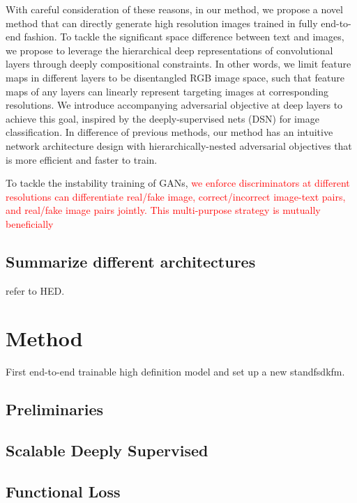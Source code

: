 \documentclass[10pt,twocolumn,letterpaper]{article}
\begin{document}
With careful consideration of these reasons, in our method, we propose a novel method that can directly generate high resolution images trained in fully end-to-end fashion. To tackle the significant space difference between text and images, we propose to leverage the hierarchical deep representations of convolutional layers through deeply compositional constraints. In other words, we limit feature maps in different layers to be disentangled RGB image space, such that feature maps of any layers can linearly represent targeting images at corresponding resolutions. We introduce accompanying adversarial objective at deep layers to achieve this goal, inspired by the deeply-supervised nets (DSN) \cite{lee2015deeply} for image classification.
In difference of previous methods, our method has an intuitive network architecture design with hierarchically-nested adversarial objectives that is more efficient and faster to train.

To tackle the instability training of GANs, \textcolor{red}{we enforce discriminators at different resolutions can differentiate real/fake image, correct/incorrect image-text pairs, and real/fake image pairs jointly. This multi-purpose strategy is mutually beneficially }








\subsection{Summarize different architectures}
refer to HED.

\section{Method}
First end-to-end trainable high definition model and set up a new standfsdkfm.

\subsection{Preliminaries}

\subsection{Scalable Deeply Supervised}

\subsection{Functional Loss}
\end{document}
